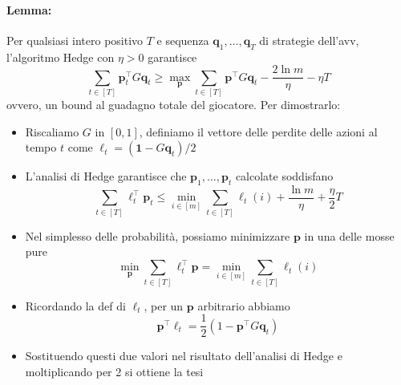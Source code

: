 \paragraph{Lemma:} Per qualsiasi intero positivo $T$ e sequenza $\bm q_1, \dots, \bm q_T$ di strategie dell'avv, l'algoritmo Hedge con $\eta > 0$ garantisce
$$ \sum_{t \in [T]} \bm p_t^\top G \bm q_t \geq \max_{\bm p} \sum_{t \in [T]} \bm p^\top G \bm q_t - \frac{2 \ln m}{\eta} - \eta T $$
ovvero, un bound al guadagno totale del giocatore. Per dimostrarlo:
\begin{itemize}
	\item Riscaliamo $G$ in $[0,1]$, definiamo il vettore delle perdite delle azioni al tempo $t$ come $\bm \ell_t = \left(\bm 1 - G \bm q_t\right)/2$

	\item L'analisi di Hedge garantisce che $\bm p_1, \dots, \bm p_t$ calcolate soddisfano
	$$ \sum_{t \in [T]} \bm \ell_t^\top \bm p_t \leq \min_{i \in [m]} \sum_{t \in [T]} \ell_t (i) + \frac{\ln m}{\eta} + \frac{\eta}{2} T $$

	\item Nel simplesso delle probabilità, possiamo minimizzare $\bm p$ in una delle mosse pure
	$$ \min_{\bm p} \sum_{t \in [T]} \bm \ell_t^\top \bm p = \min_{i \in [m]} \sum_{t \in [T]} \ell_t(i) $$

	\item Ricordando la def di $\bm \ell_t$, per un $\bm p$ arbitrario abbiamo
	$$ \bm p^\top \bm \ell_t = \frac{1}{2} \left(1 - \bm p^\top G \bm q_t \right) $$

	\item Sostituendo questi due valori nel risultato dell'analisi di Hedge e moltiplicando per 2 si ottiene la tesi
\end{itemize}

